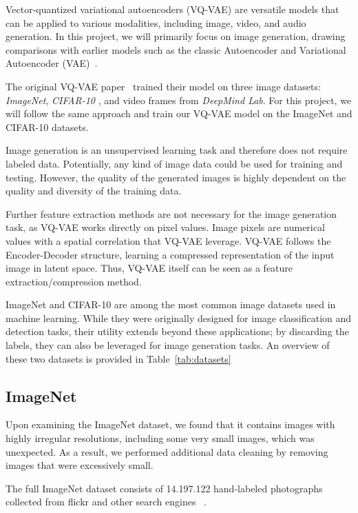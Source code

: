 Vector-quantized variational autoencoders (VQ-VAE) are versatile models that can be applied to various modalities,
including image, video, and audio generation.
In this project, we will primarily focus on image generation, drawing comparisons with earlier models such as the
classic Autoencoder and Variational Autoencoder (VAE)~\cite{vae}.

The original VQ-VAE paper~\cite{vqvae} trained their model on three image datasets: \textit{ImageNet}, \textit{CIFAR-10}
, and video frames from \textit{DeepMind Lab}.
For this project, we will follow the same approach and train our VQ-VAE model on the ImageNet and CIFAR-10 datasets.

Image generation is an unsupervised learning task and therefore does not require labeled data.
Potentially, any kind of image data could be used for training and testing.
However, the quality of the generated
images is highly dependent on
the quality and diversity of the training data.

Further feature extraction methods are not necessary for the image generation task, as VQ-VAE works directly on pixel
values.
Image pixels are numerical values with a spatial correlation that VQ-VAE leverage.
VQ-VAE follows the Encoder-Decoder structure, learning a compressed representation of the input image in latent space.
Thus, VQ-VAE itself can be seen as a feature extraction/compression method.

ImageNet and CIFAR-10 are among the most common image datasets used in machine learning.
While they were originally designed for image classification and detection tasks, their utility extends beyond
these applications; by discarding the labels, they can also be leveraged for image generation tasks.
An overview of these two datasets is provided in Table~\ref{tab:datasets}

\subsection{ImageNet}\label{subsec:imagenet}
Upon examining the ImageNet dataset, we found that it contains images with highly irregular resolutions, including some
very small images, which was unexpected.
As a result, we performed additional data cleaning by removing images that were excessively small.

The full ImageNet dataset consists of 14.197.122 hand-labeled photographs collected from flickr and other search engines
~\cite{ILSVRC15,imagenet_breakdown}.

